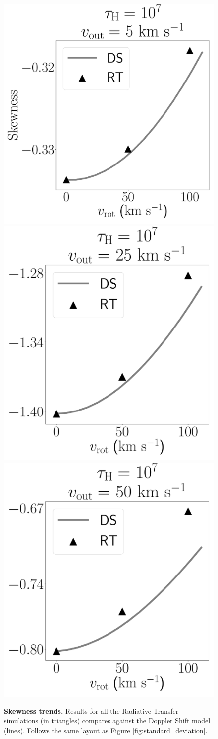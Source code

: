 \documentclass[a4paper,fleqn,usenatbib]{mnras}
\begin{document}
\begin{figure}
\begin{center}
\includegraphics[height=0.25\textwidth]{./figures/results/line_characterization_skw_vout5_logtau7}
\includegraphics[height=0.25\textwidth]{./figures/results/line_characterization_skw_vout25_logtau7}
\includegraphics[height=0.25\textwidth]{./figures/results/line_characterization_skw_vout50_logtau7}
\end{center}
\caption{\textbf{Skewness trends.} Results for all the
  Radiative Transfer simulations (in triangles) compares against the
  Doppler Shift model (lines).
  Follows the same layout as Figure \ref{fig:standard_deviation}. 
  \label{fig:skewness}}
\end{figure}
\end{document}
